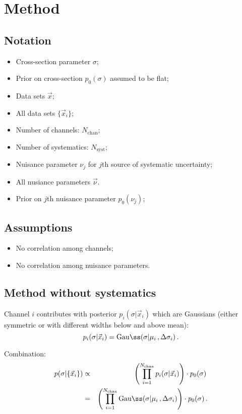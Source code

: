 \documentclass[11pt, a4paper]{article}
\begin{document}
\section*{Method}

\subsection*{Notation}
%
\begin{itemize}
\item Cross-section parameter $\sigma$;
\item Prior on cross-section $p_{0}(\sigma)$ assumed to be flat;
\item Data sets $\vec{x}$; 
\item All data sets $\{ \vec{x}_{i}\}$;
\item Number of channels: $N_{\mathrm{chan}}$;
\item Number of systematics: $N_{\mathrm{syst}}$;
\item Nuisance parameter $\nu_{j}$ for $j$th source of systematic uncertainty;
\item All nusiance parameters $\vec{\nu}$.
\item Prior on $j$th nuisance parameter $p_{0}(\nu_{j})$;
\end{itemize}

\subsection*{Assumptions} 
%
\begin{itemize}
\item No correlation among channels;
\item No correlation among nuisance parameters.
\end{itemize}

\subsection*{Method without systematics} 
%
Channel $i$ contributes with posterior $p_{i}(\sigma|\vec{x}_{i})$
which are Gaussians (either symmetric or with different widths below
and above mean): 
%
\begin{equation}
p_{i}(\sigma|\vec{x}_{i}) = \mathrm{Gau{\ss}}(\sigma|\mu_{i}\, , \Delta \sigma_{i}) \, .
\end{equation}

Combination:
%
\begin{eqnarray}
p(\sigma|\{ \vec{x}_{i}\}) & \propto & \left( \prod_{i=1}^{N_{\mathrm{chan}}} p_{i}(\sigma|\vec{x}_{i}) \right) \cdot p_{0}(\sigma) \,  \\
                          &    =     & \left( \prod_{i=1}^{N_{\mathrm{chan}}} \mathrm{Gau{\ss}}(\sigma|\mu_{i}\, , \Delta \sigma_{i}) \right) \cdot p_{0}(\sigma) \, .
\end{eqnarray}
\end{document}
